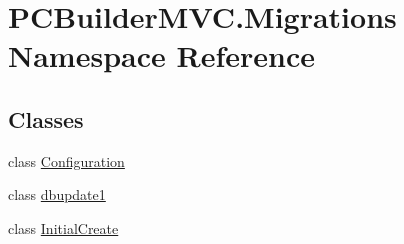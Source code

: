 \hypertarget{namespace_p_c_builder_m_v_c_1_1_migrations}{}\section{P\+C\+Builder\+M\+V\+C.\+Migrations Namespace Reference}
\label{namespace_p_c_builder_m_v_c_1_1_migrations}
\subsection*{Classes}
\begin{DoxyCompactItemize}
\item 
class \hyperlink{class_p_c_builder_m_v_c_1_1_migrations_1_1_configuration}{Configuration}
\item 
class \hyperlink{class_p_c_builder_m_v_c_1_1_migrations_1_1dbupdate1}{dbupdate1}
\item 
class \hyperlink{class_p_c_builder_m_v_c_1_1_migrations_1_1_initial_create}{Initial\+Create}
\end{DoxyCompactItemize}
